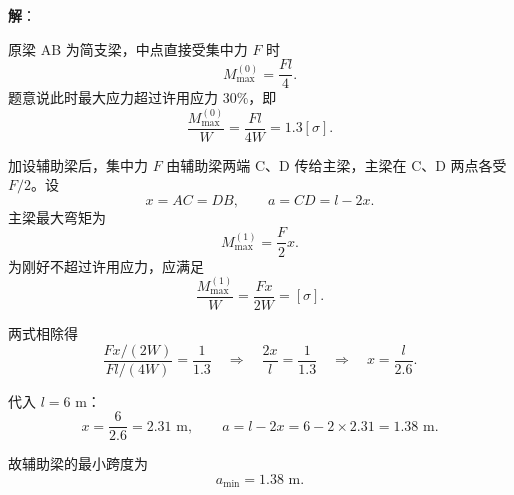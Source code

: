 \documentclass[11pt,a4paper]{ctexrep}
\begin{document}
{\textbf{解}：

原梁 AB 为简支梁，中点直接受集中力 $F$ 时
\[
M_{\max}^{(0)}=\frac{Fl}{4}.
\]
题意说此时最大应力超过许用应力 $30\%$，即
\[
\frac{M_{\max}^{(0)}}{W}
=\frac{Fl}{4W}
=1.3[\sigma].
\]

加设辅助梁后，集中力 $F$ 由辅助梁两端 C、D 传给主梁，主梁在 C、D 两点各受 $F/2$。设
\[
x=AC=DB,
\qquad
a=CD=l-2x.
\]
主梁最大弯矩为
\[
M_{\max}^{(1)}=\frac{F}{2}x.
\]
为刚好不超过许用应力，应满足
\[
\frac{M_{\max}^{(1)}}{W}
=\frac{Fx}{2W}
=[\sigma].
\]

两式相除得
\[
\frac{Fx/(2W)}{Fl/(4W)}
=\frac{1}{1.3}
\quad\Rightarrow\quad
\frac{2x}{l}=\frac{1}{1.3}
\quad\Rightarrow\quad
x=\frac{l}{2.6}.
\]

代入 $l=6\text{ m}$：
\[
x=\frac{6}{2.6}=2.31\text{ m},
\qquad
a=l-2x=6-2\times2.31=1.38\text{ m}.
\]

故辅助梁的最小跨度为
\[
a_{\min}=1.38\text{ m}.
\]


}
\end{document}
